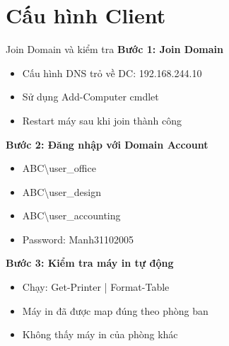 \documentclass{beamer}
\begin{document}
    \section{Cấu hình Client}
    \begin{frame}{Join Domain và kiểm tra}
        \textbf{Bước 1: Join Domain}
        \begin{itemize}
            \item Cấu hình DNS trỏ về DC: 192.168.244.10
            \item Sử dụng Add-Computer cmdlet
            \item Restart máy sau khi join thành công
        \end{itemize}
        
        \vspace{0.3cm}
        \textbf{Bước 2: Đăng nhập với Domain Account}
        \begin{itemize}
            \item ABC\textbackslash user\_office
            \item ABC\textbackslash user\_design
            \item ABC\textbackslash user\_accounting
            \item Password: Manh31102005
        \end{itemize}
        
        \vspace{0.3cm}
        \textbf{Bước 3: Kiểm tra máy in tự động}
        \begin{itemize}
            \item Chạy: Get-Printer | Format-Table
            \item Máy in đã được map đúng theo phòng ban
            \item Không thấy máy in của phòng khác
        \end{itemize}
    \end{frame}
    
\end{document}
